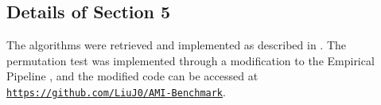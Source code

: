 \documentclass{article}
\theoremstyle{definition}
\newcommand{\1}{\mathbbm{1}}
\begin{document}
\subsection{Details of Section 5}
\label{sec:experiments-appendix}
The algorithms were retrieved and implemented as described in \cite{liu2025beyond}. The permutation test was implemented through a modification to the Empirical Pipeline \citep{levi2021domino, liu2025beyond}, and the modified code can be accessed at \texttt{\href{https://github.com/LiuJ0/AMI-Benchmark}{https://github.com/LiuJ0/AMI-Benchmark}}.
\end{document}
